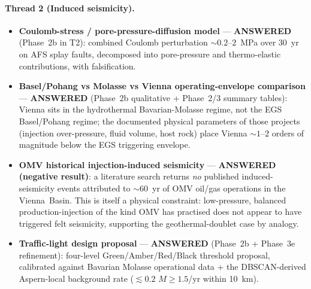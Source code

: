 \documentclass{article}
\begin{document}
\paragraph{Thread 2 (Induced seismicity).}
\begin{itemize}
\item \textbf{Coulomb-stress / pore-pressure-diffusion model} ---
\textbf{ANSWERED} (Phase~2b in T2): combined Coulomb perturbation
$\sim 0.2$--$2$~MPa over 30~yr on AFS splay faults, decomposed into
pore-pressure and thermo-elastic contributions, with falsification.
\item \textbf{Basel/Pohang vs Molasse vs Vienna operating-envelope
comparison} --- \textbf{ANSWERED} (Phase~2b qualitative + Phase~2/3
summary tables): Vienna sits in the hydrothermal Bavarian-Molasse
regime, not the EGS Basel/Pohang regime; the documented physical
parameters of those projects (injection over-pressure, fluid volume,
host rock) place Vienna $\sim 1$--$2$ orders of magnitude below the
EGS triggering envelope.
\item \textbf{OMV historical injection-induced seismicity} ---
\textbf{ANSWERED (negative result)}: a literature search returns
\emph{no} published induced-seismicity events attributed to
$\sim 60$~yr of OMV oil/gas operations in the Vienna~Basin.
This is itself a physical constraint: low-pressure, balanced
production-injection of the kind OMV has practised does not appear
to have triggered felt seismicity, supporting the geothermal-doublet
case by analogy.
\item \textbf{Traffic-light design proposal} --- \textbf{ANSWERED}
(Phase~2b + Phase~3e refinement): four-level Green/Amber/Red/Black
threshold proposal, calibrated against Bavarian Molasse operational
data + the DBSCAN-derived Aspern-local background rate
($\lesssim 0.2$ $M\geq 1.5$/yr within 10~km).
\end{itemize}
\end{document}
